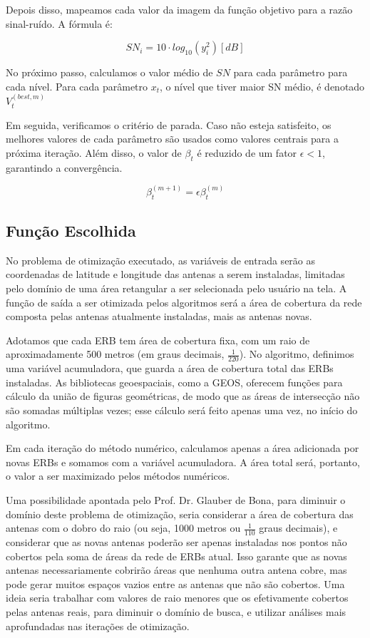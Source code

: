 \documentclass[]{politex}
\begin{document}
Depois disso, mapeamos cada valor da imagem da função objetivo para a razão
sinal-ruído. A fórmula é:

\begin{equation}
    SN_i = 10\cdot log_{10}(y_i^2) [dB]
\end{equation}

No próximo passo, calculamos o valor médio de $SN$ para cada parâmetro para cada
nível. Para cada parâmetro $x_t$, o nível que tiver maior SN médio, é denotado
$V_t^{(best, m)}$

Em seguida, verificamos o critério de parada. Caso não esteja satisfeito, os
melhores valores de cada parâmetro são usados como valores centrais para a
próxima iteração. Além disso, o valor de $\beta_t$ é reduzido de um fator
$\epsilon < 1$, garantindo a convergência.

\begin{equation}
    \beta_t^{(m+1)} = \epsilon\beta_t^{(m)}
\end{equation}

\subsection{Função Escolhida}

No problema de otimização executado, as variáveis de entrada serão as
coordenadas de latitude e longitude das antenas a serem instaladas, limitadas
pelo domínio de uma área retangular a ser selecionada pelo usuário na tela.
A função de saída a ser otimizada pelos algoritmos será a área de cobertura da
rede composta pelas antenas atualmente instaladas, mais as antenas novas.

Adotamos que cada ERB tem área de cobertura fixa, com um raio de aproximadamente
500 metros (em graus decimais, $\frac{1}{220}$). No algoritmo, definimos uma
variável acumuladora, que guarda a área de cobertura total das ERBs instaladas.
As bibliotecas geoespaciais, como a GEOS, oferecem funções para cálculo da união
de figuras geométricas, de modo que as áreas de intersecção não são somadas
múltiplas vezes; esse cálculo será feito apenas uma vez, no início do
algoritmo.

Em cada iteração do método numérico, calculamos apenas a área adicionada por
novas ERBs e somamos com a variável acumuladora. A área total será, portanto, o
valor a ser maximizado pelos métodos numéricos.

Uma possibilidade apontada pelo Prof. Dr. Glauber de Bona, para diminuir o
domínio deste problema de otimização, seria considerar a área de cobertura das
antenas com o dobro do raio (ou seja, 1000 metros ou $\frac{1}{110}$ graus
decimais), e considerar que as novas antenas poderão ser apenas instaladas
nos pontos não cobertos pela soma de áreas da rede de ERBs atual. Isso garante
que as novas antenas necessariamente cobrirão áreas que nenhuma outra antena
cobre, mas pode gerar muitos espaços vazios entre as antenas que não são
cobertos. Uma ideia seria trabalhar com valores de raio menores que os
efetivamente cobertos pelas antenas reais, para diminuir o domínio de busca, e
utilizar análises mais aprofundadas nas iterações de otimização.
\end{document}
